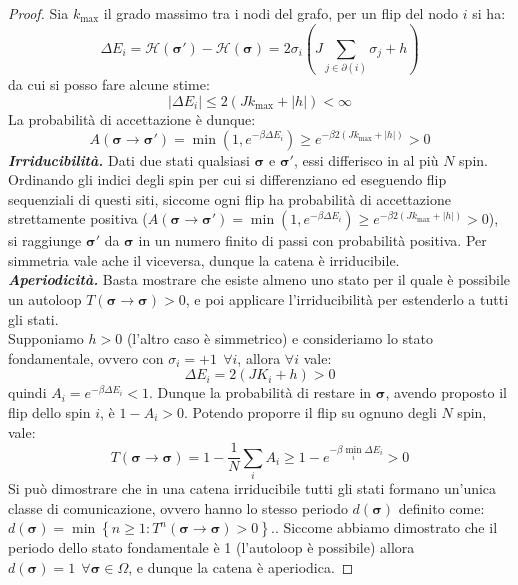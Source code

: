 \begin{proof}
    Sia $k_{\text{max}}$ il grado massimo tra i nodi del grafo, per un flip del nodo $i$ si ha:
    \begin{equation}
        \Delta E_i=\mathcal{H}(\mathbf{\sigma}')-\mathcal{H}(\mathbf{\sigma})=2\sigma_i \left(J \sum_{j \in \partial(i)}^{}\sigma_j + h\right) 
    \end{equation}
    da cui si posso fare alcune stime:
    \begin{equation}
        \left\lvert \Delta E_i\right\rvert \le 2(Jk_{\text{max}}+ \left\lvert h\right\rvert ) < \infty
    \end{equation}
    La probabilità di accettazione è dunque:
    \begin{equation}
        A(\mathbf{\sigma} \to \mathbf{\sigma}')=\min(1, e^{-\beta \Delta E_i}) \ge e^{-\beta 2(Jk_{\text{max}}+\left\lvert h\right\rvert )} >0
    \end{equation}
    \textbf{\textit{Irriducibilità.}} Dati due stati qualsiasi $\mathbf{\sigma}$ e $\mathbf{\sigma}'$, essi differisco in al più $N$ spin. Ordinando gli indici degli spin per cui si differenziano ed eseguendo flip sequenziali di questi siti, siccome ogni flip ha probabilità di accettazione strettamente positiva ($A(\mathbf{\sigma} \to \mathbf{\sigma}')=\min(1, e^{-\beta \Delta E_i}) \ge e^{-\beta 2(Jk_{\text{max}}+\left\lvert h\right\rvert )} >0$), si raggiunge $\mathbf{\sigma}'$ da $\mathbf{\sigma}$ in un numero finito di passi con probabilità positiva.
    Per simmetria vale ache il viceversa, dunque la catena è irriducibile.\\

   \textbf{ \textit{Aperiodicità.}} Basta mostrare che esiste almeno uno stato per il quale è possibile un autoloop $T(\mathbf{\sigma} \to \mathbf{\sigma})>0$, e poi applicare l'irriducibilità per estenderlo a tutti gli stati.\\
    Supponiamo $h >0$ (l'altro caso è simmetrico) e consideriamo lo stato fondamentale, ovvero con $\sigma_i =+1 \ \ \forall i$, allora $\forall i$ vale:
    \begin{equation}
        \Delta E_i=2(JK_i+h)>0
    \end{equation}
    quindi $A_i=e^{-\beta \Delta E_i}<1$. Dunque la probabilità di restare in $\mathbf{\sigma}$, avendo proposto il flip dello spin $i$, è $1-A_i >0$. Potendo proporre il flip su ognuno degli $N$ spin, vale:
    \begin{equation}
        T(\mathbf{\sigma} \to \mathbf{\sigma})=1-\frac{1}{N}\sum_{i}^{}A_i \ge 1-e^{-\beta \min_{i}\Delta E_i}>0
    \end{equation}
    Si può dimostrare che in una catena irriducibile tutti gli stati formano un'unica classe di comunicazione, ovvero hanno lo stesso periodo $d(\mathbf{\sigma})$ definito come: $d(\mathbf{\sigma})=\min\left\{n \ge 1 : T^{n}(\mathbf{\sigma} \to \mathbf{\sigma}) >0\right\}.$.
    Siccome abbiamo dimostrato che il periodo dello stato fondamentale è 1 (l'autoloop è possibile) allora $d(\mathbf{\sigma})=1 \ \ \forall \mathbf{\sigma} \in \Omega$, e dunque la catena è aperiodica.
\end{proof}

